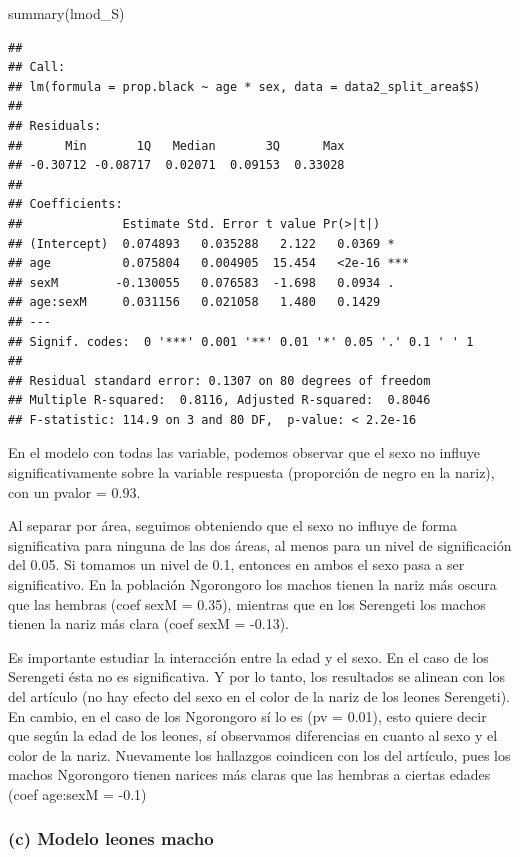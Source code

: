 \documentclass[
]{article}
\newenvironment{Shaded}{\begin{snugshade}}{\end{snugshade}}
\newcommand{\FunctionTok}[1]{\textcolor[rgb]{0.00,0.00,0.00}{#1}}
\newcommand{\NormalTok}[1]{#1}
\begin{document}
\begin{Shaded}
\begin{Highlighting}[]
\FunctionTok{summary}\NormalTok{(lmod\_S)}
\end{Highlighting}
\end{Shaded}

\begin{verbatim}
## 
## Call:
## lm(formula = prop.black ~ age * sex, data = data2_split_area$S)
## 
## Residuals:
##      Min       1Q   Median       3Q      Max 
## -0.30712 -0.08717  0.02071  0.09153  0.33028 
## 
## Coefficients:
##              Estimate Std. Error t value Pr(>|t|)    
## (Intercept)  0.074893   0.035288   2.122   0.0369 *  
## age          0.075804   0.004905  15.454   <2e-16 ***
## sexM        -0.130055   0.076583  -1.698   0.0934 .  
## age:sexM     0.031156   0.021058   1.480   0.1429    
## ---
## Signif. codes:  0 '***' 0.001 '**' 0.01 '*' 0.05 '.' 0.1 ' ' 1
## 
## Residual standard error: 0.1307 on 80 degrees of freedom
## Multiple R-squared:  0.8116, Adjusted R-squared:  0.8046 
## F-statistic: 114.9 on 3 and 80 DF,  p-value: < 2.2e-16
\end{verbatim}

En el modelo con todas las variable, podemos observar que el sexo no
influye significativamente sobre la variable respuesta (proporción de
negro en la nariz), con un pvalor = 0.93.

Al separar por área, seguimos obteniendo que el sexo no influye de forma
significativa para ninguna de las dos áreas, al menos para un nivel de
significación del 0.05. Si tomamos un nivel de 0.1, entonces en ambos el
sexo pasa a ser significativo. En la población Ngorongoro los machos
tienen la nariz más oscura que las hembras (coef sexM = 0.35), mientras
que en los Serengeti los machos tienen la nariz más clara (coef sexM =
-0.13).

Es importante estudiar la interacción entre la edad y el sexo. En el
caso de los Serengeti ésta no es significativa. Y por lo tanto, los
resultados se alinean con los del artículo (no hay efecto del sexo en el
color de la nariz de los leones Serengeti). En cambio, en el caso de los
Ngorongoro sí lo es (pv = 0.01), esto quiere decir que según la edad de
los leones, sí observamos diferencias en cuanto al sexo y el color de la
nariz. Nuevamente los hallazgos coindicen con los del artículo, pues los
machos Ngorongoro tienen narices más claras que las hembras a ciertas
edades (coef age:sexM = -0.1)

\hypertarget{c-modelo-leones-macho}{%
\subsubsection{(c) Modelo leones macho}\label{c-modelo-leones-macho}}
\end{document}

